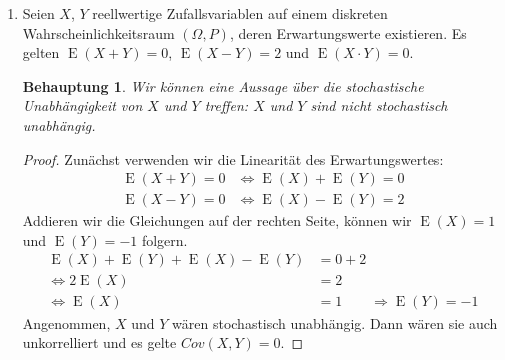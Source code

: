 \documentclass[a4paper]{scrartcl}
\newtheorem*{behaupt}{Behauptung}
\newcommand{\gdw}{\Leftrightarrow}
\newcommand{\cov}{\operatorname{Cov}}
\newcommand{\e}{\operatorname{E}}
\newcommand{\var}{\operatorname{Var}}
\begin{document}
\begin{enumerate}[label=\bfseries\arabic*.]
\begin{enumerate}[label=(\alph*)]
\begin{proof}
\begin{equation*}
\begin{split}
                            &= \frac{b \cdot \cov(X, X)}
                            {\sqrt{\var(X) \cdot \var(X) \cdot b^2}} \\
                            &= \frac{-1 \cdot |b| \cdot \var(X)}
                            {\var(X) \cdot \sqrt{b^2}} \\
                            &= \frac{-1 \cdot |b| \cdot \var(X)}
                            {\var(X) \cdot |b|} = -1
                        \end{split}
                    \end{equation*}
                \end{proof}

        \end{enumerate}

    \item
        Seien $X$, $Y$ reellwertige Zufallsvariablen auf einem diskreten
        Wahrscheinlichkeitsraum $(\Omega, P)$, deren Erwartungswerte
        existieren.
        Es gelten $\e(X+Y) = 0$, $\e(X-Y) = 2$ und $\e(X \cdot Y) = 0$.
        \begin{behaupt}
            Wir können eine Aussage über die stochastische Unabhängigkeit
            von $X$ und $Y$ treffen: $X$ und $Y$ sind nicht stochastisch
            unabhängig.
        \end{behaupt}
        \begin{proof}
            Zunächst verwenden wir die Linearität des Erwartungswertes:
            \begin{align*}
                \e(X + Y) = 0 &\gdw \e(X) + \e(Y) = 0 \\
                \e(X - Y) = 0 &\gdw \e(X) - \e(Y) = 2
            \end{align*}
            Addieren wir die Gleichungen auf der rechten Seite, können wir
            $\e(X) = 1$ und $\e(Y) = -1$ folgern.
            \begin{equation*}
                \begin{split}
                    \e(X) + \e(Y) + \e(X) - \e(Y) &= 0 + 2 \\
                    \gdw 2\e(X) &= 2 \\
                    \gdw \e(X) &= 1 \qquad \Rightarrow \e(Y) = -1
                \end{split}
            \end{equation*}
            Angenommen, $X$ und $Y$ wären stochastisch unabhängig.
            Dann wären sie auch unkorrelliert und es gelte $Cov(X, Y) = 0$.

\end{proof}
\end{enumerate}
\end{document}
